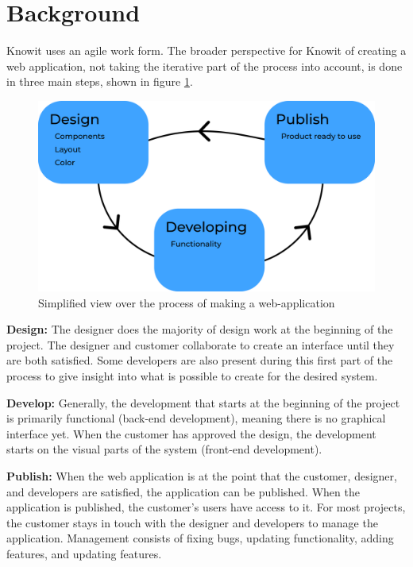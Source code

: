 \newpage
\section{Background}
Knowit uses an agile work form. The broader perspective for Knowit of creating a web application, not taking the iterative part of the process into account, is done in three main steps, shown in figure \ref{fig:ddp}. 

\begin{figure}[H]
  \centering
  \includegraphics[width=0.8\linewidth]{images/ddp.png}
  \caption{Simplified view over the process of making a web-application}%
  \label{fig:ddp}
\end{figure}


\textbf{Design:} The designer does the majority of design work at the beginning of the project. The designer and customer collaborate to create an interface until they are both satisfied.  Some developers are also present during this first part of the process to give insight into what is possible to create for the desired system.

\textbf{Develop:} Generally, the development that starts at the beginning of the project is primarily functional (back-end development), meaning there is no graphical interface yet. When the customer has approved the design, the development starts on the visual parts of the system (front-end development). 

\textbf{Publish:} When the web application is at the point that the customer, designer, and developers are satisfied, the application can be published. When the application is published, the customer's users have access to it. For most projects, the customer stays in touch with the designer and developers to manage the application. Management consists of fixing bugs, updating functionality, adding features, and updating features.

